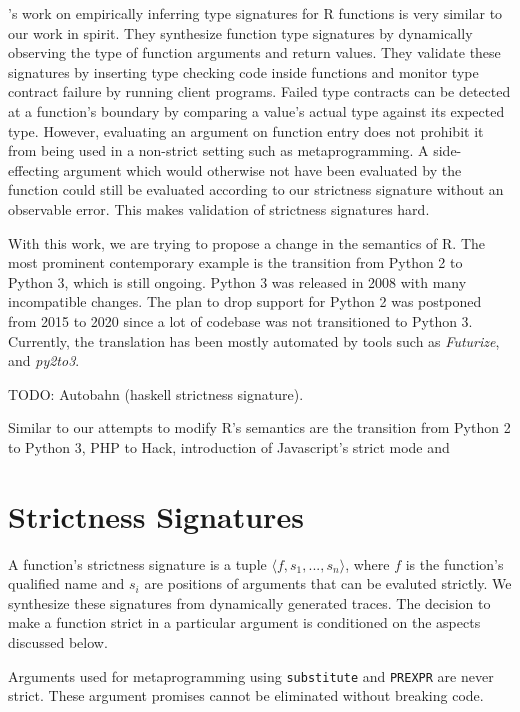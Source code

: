 \documentclass[screen,acmsmall]{acmart}
\newcommand{\code}[1]{\lstinline[style=R]|#1|\xspace}
\begin{document}
\cite{oopsla20b}'s work on empirically inferring type signatures for R functions
is very similar to our work in spirit. They synthesize function type signatures
by dynamically observing the type of function arguments and return values. They
validate these signatures by inserting type checking code inside functions and
monitor type contract failure by running client programs. Failed type contracts
can be detected at a function's boundary by comparing a value's actual type
against its expected type. However, evaluating an argument on function entry
does not prohibit it from being used in a non-strict setting such as
metaprogramming. A side-effecting argument which would otherwise not have been
evaluated by the function could still be evaluated according to our strictness
signature without an observable error. This makes validation of strictness
signatures hard.

With this work, we are trying to propose a change in the semantics of R. The
most prominent contemporary example is the transition from Python 2 to Python 3,
which is still ongoing. Python 3 was released in 2008 with many incompatible
changes. The plan \cite{pysunset} to drop support for Python 2 was postponed
from 2015 to 2020 since a lot of codebase was not transitioned to Python 3.
Currently, the translation has been mostly automated by tools such as
\emph{Futurize}, and \emph{py2to3}.

TODO: Autobahn (haskell strictness signature).

Similar to our attempts to modify R's semantics are the transition from Python 2
to Python 3, PHP to Hack, introduction of Javascript's strict mode and 

\section{Strictness Signatures}

A function's strictness signature is a tuple $\langle f, s_1, ..., s_n \rangle$,
where $f$ is the function's qualified name and $s_i$ are positions of arguments
that can be evaluted strictly. We synthesize these signatures from dynamically
generated traces. The decision to make a function strict in a particular
argument is conditioned on the aspects discussed below.

Arguments used for metaprogramming using \code{substitute} and \code{PREXPR} are
never strict. These argument promises cannot be eliminated without breaking
code.
\end{document}
